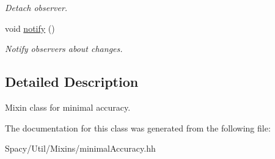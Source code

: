 \begin{DoxyCompactItemize}
\begin{DoxyCompactList}\small\item\em Detach observer. \end{DoxyCompactList}\item 
\hypertarget{classSpacy_1_1Mixin_1_1MixinConnection_a1ddeaa78a3bb4a38c2cca36d1f99fe36}{}void \hyperlink{classSpacy_1_1Mixin_1_1MixinConnection_a1ddeaa78a3bb4a38c2cca36d1f99fe36}{notify} ()\label{classSpacy_1_1Mixin_1_1MixinConnection_a1ddeaa78a3bb4a38c2cca36d1f99fe36}

\begin{DoxyCompactList}\small\item\em Notify observers about changes. \end{DoxyCompactList}\end{DoxyCompactItemize}


\subsection{Detailed Description}
Mixin class for minimal accuracy. 

The documentation for this class was generated from the following file\+:\begin{DoxyCompactItemize}
\item 
Spacy/\+Util/\+Mixins/minimal\+Accuracy.\+hh\end{DoxyCompactItemize}
